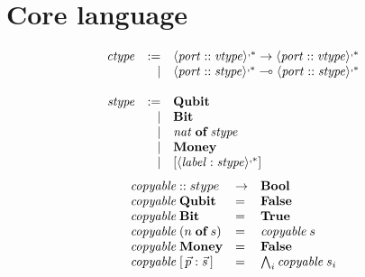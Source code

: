 \documentclass{article}
\newcommand{\lollipop}{\multimap}
\newcommand{\Sc}[1]{\mathit{#1}}
\newcommand{\group}[1]{\langle #1 \rangle}
\newcommand{\port}{\Sc{port}}
\newcommand{\vtype}{\Sc{vtype}}
\newcommand{\ctype}{\Sc{ctype}}
\newcommand{\stype}{\Sc{stype}}
\newcommand{\SD}[1]{\green{\textbf{#1}}}
\newcommand{\Qubit}{\SD{Qubit}}
\newcommand{\Bit}{\SD{Bit}}
\newcommand{\Vector}[2]{#2 \; \SD{of} \; #1}
\newcommand{\Money}{\SD{Money}}
\newcommand{\Nat}{\Sc{nat}}
\newcommand{\RowLabel}{\Sc{label}}
\newcommand{\Row}[1]{\green{[} #1 \green{]}}
\newcommand{\Bool}{\textbf{Bool}}
\newcommand{\copyable}{\textit{copyable}}
\newcommand{\True}{\textbf{True}}
\newcommand{\False}{\textbf{False}}
\begin{document}
\section*{Core language}
\[
\begin{array}{rrl}
\ctype & := & \group{\port :: \vtype}^{,\ast} \rightarrow \group{\port :: \vtype}^{,\ast} \\
& | & \group{\port :: \stype}^{,\ast} \lollipop \group{\port :: \stype}^{,\ast} \\
\\
\stype & := & \Qubit \\
& | & \Bit \\
& | & \Vector \stype \Nat \\
& | & \Money \\
& | & \Row{\group{\RowLabel : \stype}^{,\ast}} \\
\end{array}
\]
\[
\begin{array}{l@{\;}lll}
  \copyable & :: stype & \rightarrow & \Bool \\
  \copyable & \Qubit & = & \False \\
  \copyable & \Bit & = & \True \\
  \copyable & (\Vector s n) & = & \copyable \; s \\
  \copyable & \Money & = & \False \\
  \copyable & \Row{\, \vec p : \vec s \,} & = & \bigwedge_i \copyable \; s_i \\
\end{array}
\]

\end{document}
